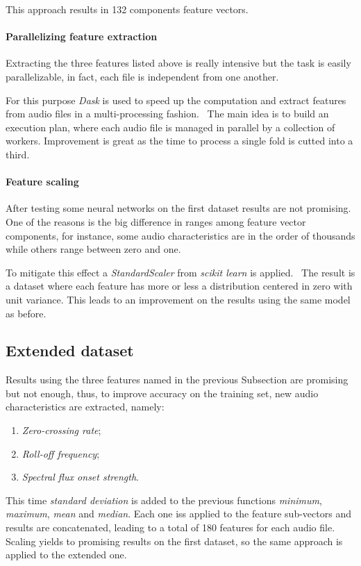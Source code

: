 This approach results in 132 components feature vectors.

\paragraph{Parallelizing feature extraction}
Extracting the three features listed above is really intensive 
but the task is easily parallelizable, in fact, each file is independent 
from one another.

For this purpose \emph{Dask} is used to speed up the computation and 
extract features from audio files in a multi-processing fashion.~\cite{dask}
The main idea is to build an execution plan, where each audio file 
is managed in parallel by a collection of workers. 
Improvement is great as the time to process a single fold 
is cutted into a third.

\paragraph{Feature scaling}
After testing some neural networks on the first dataset results 
are not promising. One of the reasons is the big difference in 
ranges among feature vector components, for instance, 
some audio characteristics are in the order of thousands while others 
range between zero and one.

To mitigate this effect a \emph{StandardScaler} from \emph{scikit learn} is applied.~\cite{scaler}
The result is a dataset where each feature has more or less a distribution 
centered in zero with unit variance.
This leads to an improvement on the results using the same
model as before. 


\subsection{Extended dataset}
\label{extended-dataset}

Results using the three features named in the previous Subsection 
are promising but not enough, thus, to improve accuracy on the training set, 
new audio characteristics are extracted, namely:
\begin{enumerate}
    \item \emph{Zero-crossing rate};
    \item \emph{Roll-off frequency};
    \item \emph{Spectral flux onset strength}.
\end{enumerate}
This time \emph{standard deviation} is added to
the previous functions \emph{minimum}, \emph{maximum}, \emph{mean} 
and \emph{median}. Each one iss applied to the feature sub-vectors and 
results are concatenated, leading to a total of 180 features for each audio file.
Scaling yields to promising results on the first dataset, 
so the same approach is applied to the extended one.

